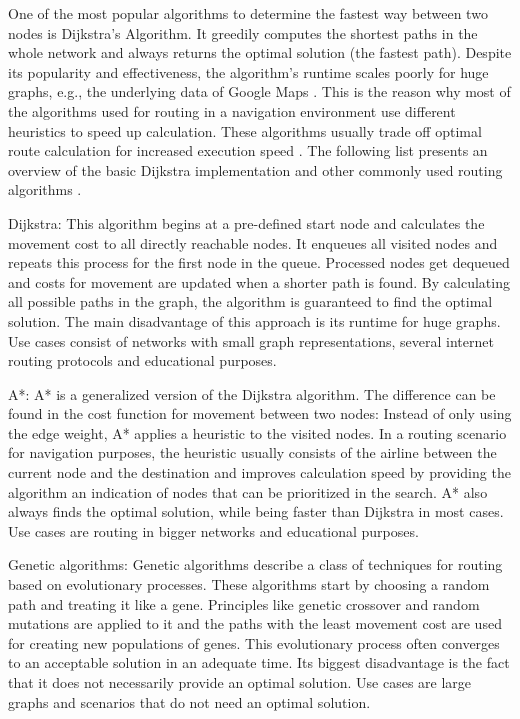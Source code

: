 One of the most popular algorithms to determine the fastest way between two nodes is Dijkstra's Algorithm. It greedily computes the shortest paths in the whole network and always returns the optimal solution (the fastest path). Despite its popularity and effectiveness, the algorithm's runtime scales poorly for huge graphs, e.g., the underlying data of Google Maps \cite{google_maps}. This is the reason why most of the algorithms used for routing in a navigation environment use different heuristics to speed up calculation. These algorithms usually trade off optimal route calculation for increased execution speed \cite{routing_algorithms}. The following list presents an overview of the basic Dijkstra implementation and other commonly used routing algorithms \cite{routing_algorithms}.

Dijkstra: This algorithm begins at a pre-defined start node and calculates the movement cost to all directly reachable nodes. It enqueues all visited nodes and repeats this process for the first node in the queue. Processed nodes get dequeued and costs for movement are updated when a shorter path is found. By calculating all possible paths in the graph, the algorithm is guaranteed to find the optimal solution. The main disadvantage of this approach is its runtime for huge graphs. Use cases consist of networks with small graph representations, several internet routing protocols and educational purposes.

A*: A* is a generalized version of the Dijkstra algorithm. The difference can be found in the cost function for movement between two nodes: Instead of only using the edge weight, A* applies a heuristic to the visited nodes. In a routing scenario for navigation purposes, the heuristic usually consists of the airline between the current node and the destination and improves calculation speed by providing the algorithm an indication of nodes that can be prioritized in the search. A* also always finds the optimal solution, while being faster than Dijkstra in most cases. Use cases are routing in bigger networks and educational purposes.

Genetic algorithms: Genetic algorithms describe a class of techniques for routing based on evolutionary processes. These algorithms start by choosing a random path and treating it like a gene. Principles like genetic crossover and random mutations are applied to it and the paths with the least movement cost are used for creating new populations of genes. This evolutionary process often converges to an acceptable solution in an adequate time. Its biggest disadvantage is the fact that it does not necessarily provide an optimal solution. Use cases are large graphs and scenarios that do not need an optimal solution.

